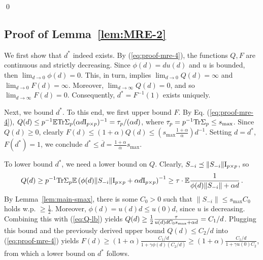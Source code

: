 \documentclass[times,sort&compress,3p]{elsarticle}
\begin{document}
\qed

\subsection{Proof of Lemma~\ref{lem:MRE-2}}
\label{sec:proof-lem:MRE-2}

We first show that $d^*$ indeed exists. By (\ref{eq:proof-mre-4}), the functions $Q,F$ are continuous and strictly decreasing. 
Since $\phi(d)=du(d)$ and $u$ is bounded, then $\lim_{d\to0}\phi(d)=0$. This, in turn, implies
$\lim_{d\to 0}Q(d)=\infty$ and $\lim_{d\to 0}F(d)=\infty$. Moreover, $\lim_{d\to \infty}Q(d)=0$, and so $ \lim_{d\to \infty}F(d)=0$. 
Consequently, $d^*=F^{-1}(1)$ exists uniquely.

Next, we bound $d^*$. To this end, we first upper bound $F$. By Eq. (\ref{eq:proof-mre-4}), 
$Q(d) \le p^{-1}{\mathbb{E}} \textrm{Tr}\Sigma_p(\alpha d \mathrm{I}_{p \times p})^{-1} = \tau_p/(\alpha d)$, where $\tau_p=p^{-1}\textrm{Tr}\Sigma_p \le s_{\max}$. Since $Q(d)\ge 0$, clearly $F(d)\le (1+\alpha)Q(d)\le (s_{\max}\frac{1+\alpha}{\alpha})d^{-1}$. Setting $d=d^*$, $F(d^*)=1$, we conclude $d^* \le \overline{d}=\frac{1+\alpha}{\alpha}s_{\max}$.

To lower bound $d^*$, we need a lower bound on $Q$.
Clearly, $S_{-i}\preceq \|S_{-i}\|\mathrm{I}_{p \times p} $, 
so
\begin{equation}\label{eq:Q-lb}
    Q(d) \ge
    p^{-1}\textrm{Tr} \Sigma_p {\mathbb{E}} \left(\phi(d)\|S_{-i}\|\mathrm{I}_{p \times p}+\alpha d \mathrm{I}_{p \times p}\right)^{-1}  \ge \tau\cdot {\mathbb{E}}\frac{1}{\phi(d)\|S_{-i}\|+\alpha d} \,.
\end{equation}
By Lemma~\ref{lem:main-smax}, there is some $C_0>0$ such that $\|S_{-i}\|\le s_{\max} C_0$ holds w.p. $\ge \frac12$. Moreover, $\phi(d)=u(d)d\le u(0)d$, since $u$ is decreasing. Combining this with (\ref{eq:Q-lb}) yields $Q(d)\ge \frac12 \frac{\tau}{u(d)dC_0 s_{\max}+\alpha d} = C_1/d$.
Plugging  this bound and the previously derived upper bound $Q(d)\le C_2/d$ into (\ref{eq:proof-mre-4}) yields $F(d)\ge  (1+\alpha)\frac{C_1/d}{1+\gamma \phi(d)(C_2/d)} \ge (1+\alpha) \frac{C_1/d}{1+\gamma u(0)C_2}$, 
from which a lower bound on $d^*$ follows.
\end{document}
